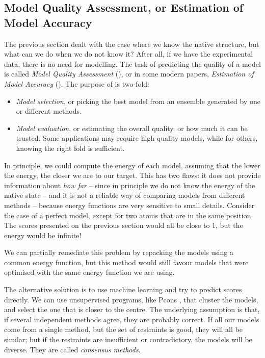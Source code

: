 \subsection[Model Quality Assessment]{Model Quality Assessment, or Estimation of Model Accuracy}
The previous section dealt with the case where we know the native structure, but what can we do when we do not know it?
After all, if we have the experimental data, there is no need for modelling.
The task of predicting the quality of a model is called \emph{Model Quality Assessment} (\MQA), or in some modern papers, \emph{Estimation of Model Accuracy} (\EMA).
The purpose of \MQA{} is two-fold:

\begin{itemize}
\item \emph{Model selection}, or picking the best model from an ensemble generated by one or different methods.
\item \emph{Model evaluation}, or estimating the overall quality, or how much it can be trusted.
Some applications may require high-quality models, while for others, knowing the right fold is sufficient.
\end{itemize}

In principle,  we could compute the energy of each model, assuming that the lower the energy, the closer we are to our target.
This has two flaws: it does not provide information about \emph{how far} -- since in principle we do not know the energy of the native state -- and it is not a reliable way of comparing models from different methods -- because energy functions are very sensitive to small details.
Consider the case of a perfect model, except for two atoms that are in the same position.
The scores presented on the previous section would all be close to 1, but the energy would be infinite!

We can partially remediate this problem by repacking the models using a common energy function, but this method would still favour models that were optimised with the same energy function we are using.


The alternative solution is to use machine learning and try to predict scores directly.
We can use unsupervised programs, like Pcons \citep{pcons}, that cluster the models, and select the one that is closer to the centre.
The underlying assumption is that, if several independent methods agree, they are probably correct.
If all our models come from a single method, but the set of restraints is good, they will all be similar; but if the restraints are insufficient or contradictory, the models will be diverse.
They are called \emph{consensus methods}.

